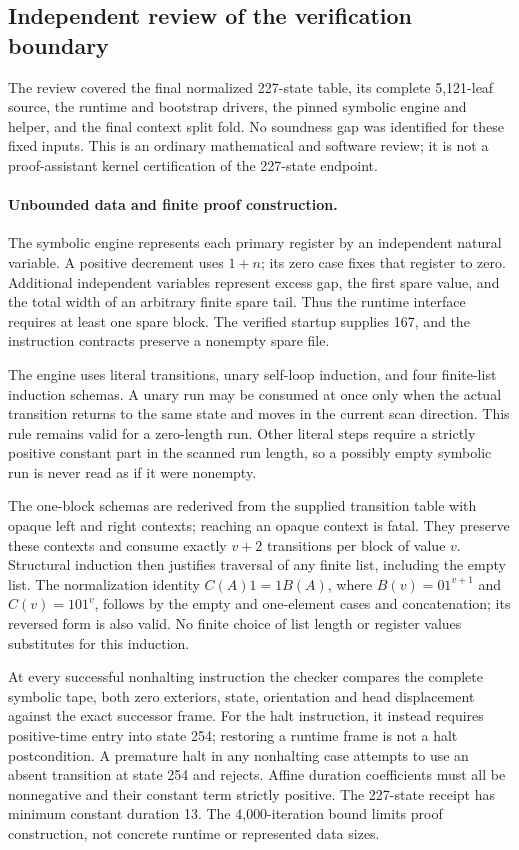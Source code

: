 \subsection{Independent review of the verification boundary}
\label{sec:independent-review}

The review covered the final normalized 227-state table, its complete
5,121-leaf source, the runtime and bootstrap drivers, the pinned symbolic
engine and helper, and the final context split fold. No soundness gap was
identified for these fixed inputs. This is an ordinary mathematical and
software review; it is not a proof-assistant kernel certification of the
227-state endpoint.

\paragraph{Unbounded data and finite proof construction.}
The symbolic engine represents each primary register by an independent
natural variable. A positive decrement uses $1+n$; its zero case fixes that
register to zero. Additional independent variables represent excess gap,
the first spare value, and the total width of an arbitrary finite spare
tail. Thus the runtime interface requires at least one spare block. The
verified startup supplies 167, and the instruction contracts preserve a
nonempty spare file.

The engine uses literal transitions, unary self-loop induction, and four
finite-list induction schemas. A unary run may be consumed at once only
when the actual transition returns to the same state and moves in the
current scan direction. This rule remains valid for a zero-length run.
Other literal steps require a strictly positive constant part in the
scanned run length, so a possibly empty symbolic run is never read as if
it were nonempty.

The one-block schemas are rederived from the supplied transition table
with opaque left and right contexts; reaching an opaque context is fatal.
They preserve these contexts and consume exactly $v+2$ transitions per
block of value $v$. Structural induction then justifies traversal of any
finite list, including the empty list. The normalization identity
$C(A)1=1B(A)$, where $B(v)=01^{v+1}$ and $C(v)=101^v$, follows by the empty
and one-element cases and concatenation; its reversed form is also valid.
No finite choice of list length or register values substitutes for this
induction.

At every successful nonhalting instruction the checker compares the
complete symbolic tape, both zero exteriors, state, orientation and head
displacement against the exact successor frame. For the halt instruction,
it instead requires positive-time entry into state 254; restoring a runtime
frame is not a halt postcondition. A premature halt in any nonhalting case
attempts to use an absent transition at state 254 and rejects. Affine
duration coefficients must all be nonnegative and their constant term
strictly positive. The 227-state receipt has minimum constant duration 13.
The 4,000-iteration bound limits proof construction, not concrete runtime
or represented data sizes.

